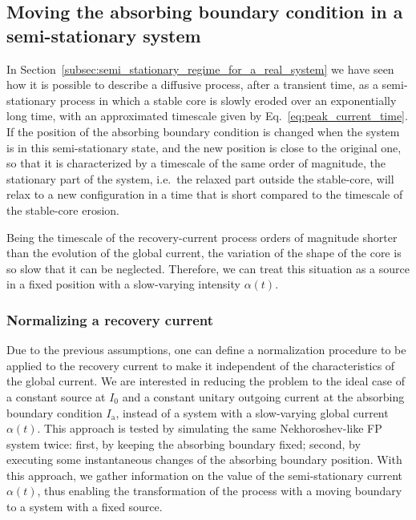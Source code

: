 
\subsection{Moving the absorbing boundary condition in a semi-stationary system}
\label{subsec:Moving_the_boundary_in_a_semi_stationary_system}


In Section~\ref{subsec:semi_stationary_regime_for_a_real_system} we have seen how it is possible to describe a diffusive process, after a transient time, as a semi-stationary process in which a stable core is slowly eroded over an exponentially long time, with an approximated timescale given by Eq.~\eqref{eq:peak_current_time}. If the position of the absorbing boundary condition is changed when the system is in this semi-stationary state, and the new position is close to the original one, so that it is characterized by a timescale of the same order of magnitude, the stationary part of the system, i.e.\ the relaxed part outside the stable-core, will relax to a new configuration in a time that is short compared to the timescale of the stable-core erosion.

Being the timescale of the recovery-current process orders of magnitude shorter than the evolution of the global current, the variation of the shape of the core is so slow that it can be neglected. Therefore, we can treat this situation as a source in a fixed position with a slow-varying intensity $\alpha(t)$. 


\subsubsection{Normalizing a recovery current}


Due to the previous assumptions, one can define a normalization procedure to be applied to the recovery current to make it independent of the characteristics of the global current. We are interested in reducing the problem to the ideal case of a constant source at $I_0$ and a constant unitary outgoing current at the absorbing boundary condition $I_\mathrm{a}$, instead of a system with a slow-varying global current $\alpha(t)$. This approach is tested by simulating the same Nekhoroshev-like FP system twice: first, by keeping the absorbing boundary fixed; second, by executing some instantaneous changes of the absorbing boundary position. With this approach, we gather information on the value of the semi-stationary current $\alpha(t)$, thus enabling the transformation of the process with a moving boundary to a system with a fixed source.

